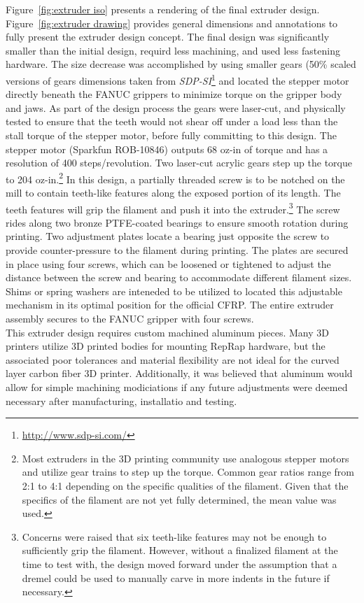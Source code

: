 Figure~\ref{fig:extruder iso} presents a rendering of the final extruder design. Figure~\ref{fig:extruder drawing} provides general dimensions and annotations to fully present the extruder design concept. The final design was significantly smaller than the initial design, requird less machining, and used less fastening hardware. The size decrease was accomplished by using smaller gears (50\% scaled versions of gears dimensions taken from \emph{SDP-SI}\footnote{\url{http://www.sdp-si.com/}} and located the stepper motor directly beneath the FANUC grippers to minimize torque on the gripper body and jaws. As part of the design process the gears were laser-cut, and physically tested to ensure that the teeth would not shear off under a load less than the stall torque of the stepper motor, before fully committing to this design. The stepper motor (Sparkfun ROB-10846) outputs 68 oz-in of torque and has a resolution of 400 steps/revolution. Two laser-cut acrylic gears step up the torque to 204 oz-in.\footnote{Most extruders in the 3D printing community use analogous stepper motors and utilize gear trains to step up the torque. Common gear ratios range from 2:1 to 4:1 depending on the specific qualities of the filament. Given that the specifics of the filament are not yet fully determined, the mean value was used.} In this design, a partially threaded screw is to be notched on the mill to contain teeth-like features along the exposed portion of its length. The teeth features will grip the filament and push it into the extruder.\footnote{Concerns were raised that six teeth-like features may not be enough to sufficiently grip the filament. However, without a finalized filament at the time to test with, the design moved forward under the assumption that a dremel could be used to manually carve in more indents in the future if necessary.} The screw rides along two bronze PTFE-coated bearings to ensure smooth rotation during printing. Two adjustment plates locate a bearing just opposite the screw to provide counter-pressure to the filament during printing. The plates are secured in place using four screws, which can be loosened or tightened to adjust the distance between the screw and bearing to accommodate different filament sizes. Shims or spring washers are inteneded to be utilized to located this adjustable mechanism in its optimal position for the official CFRP. The entire extruder assembly secures to the FANUC gripper with four screws.\\

This extruder design requires custom machined aluminum pieces. Many 3D printers utilize 3D printed bodies for mounting RepRap hardware, but the associated poor tolerances and material flexibility are not ideal for the curved layer carbon fiber 3D printer. Additionally, it was believed that aluminum would allow for simple machining modiciations if any future adjustments were deemed necessary after manufacturing, installatio and testing.\\

